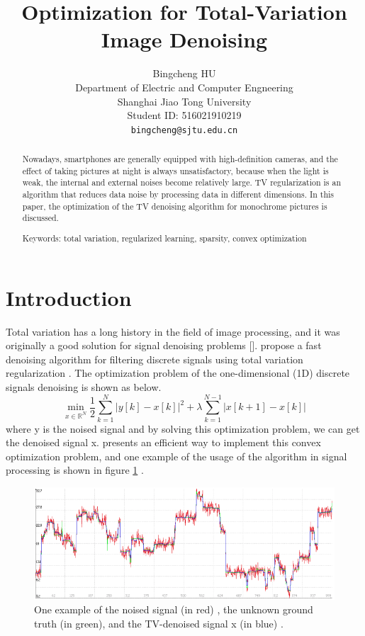 \documentclass{article}
\title{Optimization for Total-Variation Image Denoising}
\author{%
  Bingcheng HU \\
  Department of Electric and Computer Engneering\\
  Shanghai Jiao Tong University\\
  Student ID: 516021910219 \\
  \texttt{bingcheng@sjtu.edu.cn} \\
}
\begin{document}
\maketitle

\begin{abstract}
Nowadays, smartphones are generally equipped with high-definition cameras, and the effect of taking pictures at night is always unsatisfactory, because when the light is weak, the internal and external noises become relatively large. TV regularization is an algorithm that reduces data noise by processing data in different dimensions. In this paper, the optimization of the TV denoising algorithm for monochrome pictures is discussed.

Keywords: total variation, regularized learning, sparsity, convex optimization

\end{abstract}

\section{Introduction}

Total variation has a long history in the field of image processing, and it was originally a good solution for signal denoising problems [\citealp{Condat2013,Durand2003,Easley2008,Selesnick2014}]. \citet{Condat2013}  propose a fast denoising algorithm for filtering discrete signals using total variation regularization \citep{Condat2013}. The optimization problem of the one-dimensional (1D) discrete signals denoising is shown as below.
$$
\operatorname{min}_{x \in \mathbb{R}^{N}} \frac{1}{2} \sum_{k=1}^{N}|y[k]-x[k]|^{2}+\lambda \sum_{k=1}^{N-1}|x[k+1]-x[k]|
$$
where y is the noised signal and by solving this optimization problem, we can get the denoised signal x. \citet{Condat2013} presents an efficient way to implement this convex optimization problem, and one example of the usage of the algorithm in signal processing is shown in figure \ref {img1} \citep{Condat2013}.

\begin{figure}[h]
  \includegraphics[width=5in]{pic1.png}
  \centering
  \caption{One example of the noised signal (in red) , the unknown ground truth (in green), and the TV-denoised signal x (in blue) \citep{Condat2013}.}
  \label{img1}
\end{figure}
\end{document}
